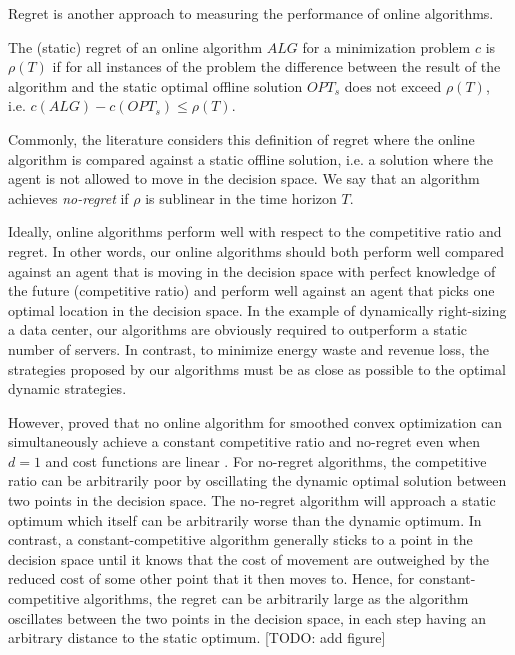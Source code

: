 Regret is another approach to measuring the performance of online algorithms.

\begin{definition}
The (static) regret of an online algorithm $ALG$ for a minimization problem $c$ is $\rho(T)$ if for all instances of the problem the difference between the result of the algorithm and the static optimal offline solution $OPT_s$ does not exceed $\rho(T)$, i.e. $c(ALG) - c(OPT_s) \leq \rho(T)$.
\end{definition}

Commonly, the literature considers this definition of regret where the online algorithm is compared against a static offline solution, i.e. a solution where the agent is not allowed to move in the decision space. We say that an algorithm achieves \textit{no-regret} if $\rho$ is sublinear in the time horizon $T$.

Ideally, online algorithms perform well with respect to the competitive ratio and regret. In other words, our online algorithms should both perform well compared against an agent that is moving in the decision space with perfect knowledge of the future (competitive ratio) and perform well against an agent that picks one optimal location in the decision space. In the example of dynamically right-sizing a data center, our algorithms are obviously required to outperform a static number of servers. In contrast, to minimize energy waste and revenue loss, the strategies proposed by our algorithms must be as close as possible to the optimal dynamic strategies.

However, \citeauthor*{Andrew2015} proved that no online algorithm for smoothed convex optimization can simultaneously achieve a constant competitive ratio and no-regret even when $d = 1$ and cost functions are linear \cite{Andrew2015}. For no-regret algorithms, the competitive ratio can be arbitrarily poor by oscillating the dynamic optimal solution between two points in the decision space. The no-regret algorithm will approach a static optimum which itself can be arbitrarily worse than the dynamic optimum. In contrast, a constant-competitive algorithm generally sticks to a point in the decision space until it knows that the cost of movement are outweighed by the reduced cost of some other point that it then moves to. Hence, for constant-competitive algorithms, the regret can be arbitrarily large as the algorithm oscillates between the two points in the decision space, in each step having an arbitrary distance to the static optimum. [TODO: add figure]

